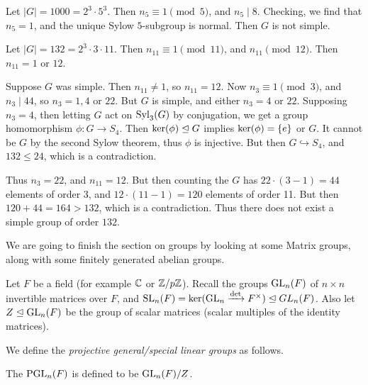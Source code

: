 \documentclass[a4paper]{scrreprt}
\begin{document}
\begin{example}
Let $|G| = 1000 = 2^3 \cdot 5^3$. Then $n_5 \equiv 1 \pmod{5}$, and $n_5 \mid 8$. Checking, we find that $n_5 = 1$, and the unique Sylow $5$-subgroup is normal. Then $G$ is not simple.
\end{example}


\begin{example}
	Let $|G| = 132 = 2^3 \cdot 3 \cdot 11$. Then $n_{11} \equiv 1 \pmod{11}$, and $n_{11} \pmod 12$. Then $n_{11} = 1$ or $12$. 

	Suppose $G$ was simple. Then $n_{11} \neq 1$, so $n_{11} = 12$. Now $n_3 \equiv 1 \pmod{3}$, and $n_3 \mid 44$, so $n_3 = 1, 4$ or $22$. But $G$ is simple, and either $n_3 = 4$ or $22$. Supposing $n_3 = 4$, then letting $G$ act on $\operatorname{Syl}_3(G)$ by conjugation, we get a group homomorphism $\phi: G \rightarrow S_4$. Then $\operatorname{ker}(\phi) \trianglelefteq G$ implies $\operatorname{ker}(\phi) = \{e\}$ or $G$. It cannot be $G$ by the second Sylow theorem, thus $\phi$ is injective. But then $G \hookrightarrow S_4$, and $132 \leq 24$, which is a contradiction.

	Thus $n_3 = 22$, and $n_11 = 12$. But then counting the $G$ has $22 \cdot (3 - 1) = 44$ elements of order 3, and $12 \cdot (11 - 1) = 120$ elements of order 11. But then $120 + 44 = 164 > 132$, which is a contradiction. Thus there does not exist a simple group of order $132$. 
\end{example}


We are going to finish the section on groups by looking at some Matrix groups, along with some finitely generated abelian groups.


Let $F$ be a field (for example $\mathbb{C}$ or $\mathbb{Z}/p\mathbb{Z}$). 
Recall the groups $\operatorname{GL}_n(F)$ of $n \times n$ 
invertible matrices over $F$, and $\operatorname{SL}_n(F) = \operatorname{ker}(\operatorname{GL}_n \xrightarrow{\det} F^\times) \trianglelefteq GL_n(F)$.
Also let $Z \trianglelefteq \operatorname{GL}_n(F)$ be the group of scalar matrices (scalar multiples of the identity matrices). 

We define the \emph{projective general/special linear groups} as follows.

\begin{definition}
	The  $\operatorname{PGL}_n(F)$ is defined to be $\operatorname{GL}_n(F) / Z$.
\end{definition}
\end{document}
